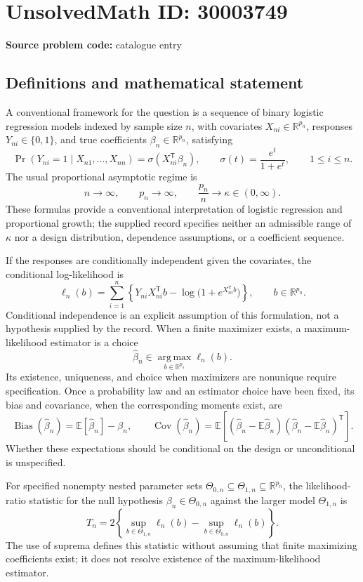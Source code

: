 \documentclass[11pt]{article}
\newcommand{\R}{\mathbb{R}}
\newcommand{\E}{\mathbb{E}}
\begin{document}
\section*{UnsolvedMath ID: 30003749}
\textbf{Source problem code:} catalogue entry
\subsection{Definitions and mathematical statement}
A conventional framework for the question is a sequence of binary logistic regression models indexed by sample size \(n\), with covariates \(X_{ni}\in\R^{p_n}\), responses \(Y_{ni}\in\{0,1\}\), and true coefficients \(\beta_n\in\R^{p_n}\), satisfying
\[
\Pr(Y_{ni}=1\mid X_{n1},\ldots,X_{nn})=\sigma(X_{ni}^{\mathsf T}\beta_n),\qquad \sigma(t)=\frac{e^t}{1+e^t},\qquad 1\le i\le n.
\]
The usual proportional asymptotic regime is
\[
n\longrightarrow\infty,\qquad p_n\longrightarrow\infty,\qquad \frac{p_n}{n}\longrightarrow\kappa\in(0,\infty).
\]
These formulas provide a conventional interpretation of logistic regression and proportional growth; the supplied record specifies neither an admissible range of \(\kappa\) nor a design distribution, dependence assumptions, or a coefficient sequence.

If the responses are conditionally independent given the covariates, the conditional log-likelihood is
\[
\ell_n(b)=\sum_{i=1}^{n}\left\{Y_{ni}X_{ni}^{\mathsf T}b-\log\bigl(1+e^{X_{ni}^{\mathsf T}b}\bigr)\right\},\qquad b\in\R^{p_n}.
\]
Conditional independence is an explicit assumption of this formulation, not a hypothesis supplied by the record. When a finite maximizer exists, a maximum-likelihood estimator is a choice
\[
\widehat\beta_n\in\operatorname*{arg\,max}_{b\in\R^{p_n}}\ell_n(b).
\]
Its existence, uniqueness, and choice when maximizers are nonunique require specification. Once a probability law and an estimator choice have been fixed, its bias and covariance, when the corresponding moments exist, are
\[
\operatorname{Bias}(\widehat\beta_n)=\E[\widehat\beta_n]-\beta_n,\qquad
\operatorname{Cov}(\widehat\beta_n)=\E\!\left[(\widehat\beta_n-\E\widehat\beta_n)(\widehat\beta_n-\E\widehat\beta_n)^{\mathsf T}\right].
\]
Whether these expectations should be conditional on the design or unconditional is unspecified.

For specified nonempty nested parameter sets \(\Theta_{0,n}\subseteq\Theta_{1,n}\subseteq\R^{p_n}\), the likelihood-ratio statistic for the null hypothesis \(\beta_n\in\Theta_{0,n}\) against the larger model \(\Theta_{1,n}\) is
\[
T_n=2\left\{\sup_{b\in\Theta_{1,n}}\ell_n(b)-\sup_{b\in\Theta_{0,n}}\ell_n(b)\right\}.
\]
The use of suprema defines this statistic without assuming that finite maximizing coefficients exist; it does not resolve existence of the maximum-likelihood estimator.
\end{document}
